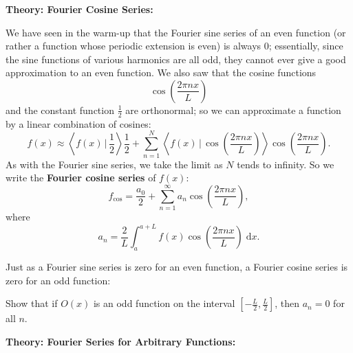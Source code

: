 \documentclass{article}
\newcommand{\diff}{\;\mathrm{d}}
\begin{document}
\clearpage















\textbf{Theory: Fourier Cosine Series:}

\bigskip



We have seen in the warm-up that the Fourier sine series of an even function (or rather a function whose periodic extension is even) is always 0; essentially, since the sine functions of various harmonics are all odd, they cannot ever give a good approximation to an even function. We also saw that the cosine functions
\[\cos\left(\frac{2\pi nx}{L}\right)\]
and the constant function $\frac{1}{2}$ are orthonormal; so we can approximate a function by a linear combination of cosines:
\[f(x)\approx \left\langle f(x)\,\Bigg|\,\frac{1}{2}\right\rangle\frac{1}{2} + \sum_{n=1}^N \left\langle f(x)\,\Bigg|\,\cos\left(\frac{2\pi nx}{L}\right)\right\rangle \cos\left(\frac{2\pi nx}{L}\right).\]
As with the Fourier sine series, we take the limit as $N$ tends to infinity. So we write the \textbf{Fourier cosine series} of $f(x)$:
\[f_\mathrm{cos}=\frac{a_0}{2}+\sum_{n=1}^\infty a_n\cos\left(\frac{2\pi nx}{L}\right),\]
where
\[a_n = \frac{2}{L}\int_a^{a+L}f(x)\cos\left(\frac{2\pi nx}{L}\right)\diff x.\]

Just as a Fourier sine series is zero for an even function, a Fourier cosine series is zero for an odd function:\medskip

Show that if $O(x)$ is an odd function on the interval $\left[-\frac{L}{2},\frac{L}{2}\right]$, then $a_n=0$ for all $n$.



\clearpage












\textbf{Theory: Fourier Series for Arbitrary Functions:}\bigskip
\end{document}
